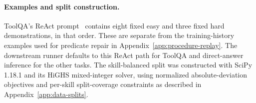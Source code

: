 \paragraph{Examples and split construction.}
ToolQA's ReAct prompt~\citep{yao2023react} contains eight fixed easy and three fixed hard demonstrations, in that order. These are separate from the training-history examples used for predicate repair in Appendix~\ref{app:procedure-replay}. The downstream runner defaults to this ReAct path for ToolQA and direct-answer inference for the other tasks. The skill-balanced split was constructed with SciPy 1.18.1 and its HiGHS mixed-integer solver, using normalized absolute-deviation objectives and per-skill split-coverage constraints as described in Appendix~\ref{app:data-splits}.
